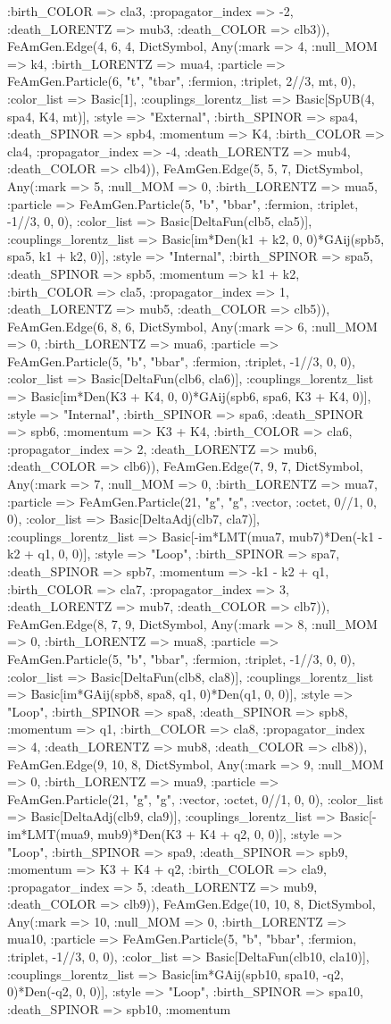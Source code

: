 \documentclass{revtex4}
\begin{document}
\begin{figure}[!htb]
\begin{center}
{:birth_COLOR => cla3, :propagator_index => -2, :death_LORENTZ => mub3, :death_COLOR => clb3)), FeAmGen.Edge(4, 6, 4, Dict{Symbol, Any}(:mark => 4, :null_MOM => k4, :birth_LORENTZ => mua4, :particle => FeAmGen.Particle(6, "t", "tbar", :fermion, :triplet, 2//3, mt, 0), :color_list => Basic[1], :couplings_lorentz_list => Basic[SpUB(4, spa4, K4, mt)], :style => "External", :birth_SPINOR => spa4, :death_SPINOR => spb4, :momentum => K4, :birth_COLOR => cla4, :propagator_index => -4, :death_LORENTZ => mub4, :death_COLOR => clb4)), FeAmGen.Edge(5, 5, 7, Dict{Symbol, Any}(:mark => 5, :null_MOM => 0, :birth_LORENTZ => mua5, :particle => FeAmGen.Particle(5, "b", "bbar", :fermion, :triplet, -1//3, 0, 0), :color_list => Basic[DeltaFun(clb5, cla5)], :couplings_lorentz_list => Basic[im*Den(k1 + k2, 0, 0)*GAij(spb5, spa5, k1 + k2, 0)], :style => "Internal", :birth_SPINOR => spa5, :death_SPINOR => spb5, :momentum => k1 + k2, :birth_COLOR => cla5, :propagator_index => 1, :death_LORENTZ => mub5, :death_COLOR => clb5)), FeAmGen.Edge(6, 8, 6, Dict{Symbol, Any}(:mark => 6, :null_MOM => 0, :birth_LORENTZ => mua6, :particle => FeAmGen.Particle(5, "b", "bbar", :fermion, :triplet, -1//3, 0, 0), :color_list => Basic[DeltaFun(clb6, cla6)], :couplings_lorentz_list => Basic[im*Den(K3 + K4, 0, 0)*GAij(spb6, spa6, K3 + K4, 0)], :style => "Internal", :birth_SPINOR => spa6, :death_SPINOR => spb6, :momentum => K3 + K4, :birth_COLOR => cla6, :propagator_index => 2, :death_LORENTZ => mub6, :death_COLOR => clb6)), FeAmGen.Edge(7, 9, 7, Dict{Symbol, Any}(:mark => 7, :null_MOM => 0, :birth_LORENTZ => mua7, :particle => FeAmGen.Particle(21, "g", "g", :vector, :octet, 0//1, 0, 0), :color_list => Basic[DeltaAdj(clb7, cla7)], :couplings_lorentz_list => Basic[-im*LMT(mua7, mub7)*Den(-k1 - k2 + q1, 0, 0)], :style => "Loop", :birth_SPINOR => spa7, :death_SPINOR => spb7, :momentum => -k1 - k2 + q1, :birth_COLOR => cla7, :propagator_index => 3, :death_LORENTZ => mub7, :death_COLOR => clb7)), FeAmGen.Edge(8, 7, 9, Dict{Symbol, Any}(:mark => 8, :null_MOM => 0, :birth_LORENTZ => mua8, :particle => FeAmGen.Particle(5, "b", "bbar", :fermion, :triplet, -1//3, 0, 0), :color_list => Basic[DeltaFun(clb8, cla8)], :couplings_lorentz_list => Basic[im*GAij(spb8, spa8, q1, 0)*Den(q1, 0, 0)], :style => "Loop", :birth_SPINOR => spa8, :death_SPINOR => spb8, :momentum => q1, :birth_COLOR => cla8, :propagator_index => 4, :death_LORENTZ => mub8, :death_COLOR => clb8)), FeAmGen.Edge(9, 10, 8, Dict{Symbol, Any}(:mark => 9, :null_MOM => 0, :birth_LORENTZ => mua9, :particle => FeAmGen.Particle(21, "g", "g", :vector, :octet, 0//1, 0, 0), :color_list => Basic[DeltaAdj(clb9, cla9)], :couplings_lorentz_list => Basic[-im*LMT(mua9, mub9)*Den(K3 + K4 + q2, 0, 0)], :style => "Loop", :birth_SPINOR => spa9, :death_SPINOR => spb9, :momentum => K3 + K4 + q2, :birth_COLOR => cla9, :propagator_index => 5, :death_LORENTZ => mub9, :death_COLOR => clb9)), FeAmGen.Edge(10, 10, 8, Dict{Symbol, Any}(:mark => 10, :null_MOM => 0, :birth_LORENTZ => mua10, :particle => FeAmGen.Particle(5, "b", "bbar", :fermion, :triplet, -1//3, 0, 0), :color_list => Basic[DeltaFun(clb10, cla10)], :couplings_lorentz_list => Basic[im*GAij(spb10, spa10, -q2, 0)*Den(-q2, 0, 0)], :style => "Loop", :birth_SPINOR => spa10, :death_SPINOR => spb10, :momentum }
\end{center}
\end{figure}
\end{document}

